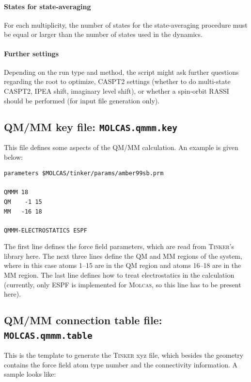 \documentclass[a4paper,10pt,DIV=15,openany,twoside=false]{scrbook}
\newcommand{\ttt}[1]{\textbf{\texttt{#1}}}
\newenvironment{example}{
  \setlength{\OuterFrameSep}{3pt}
  \vspace{0mm}
  \definecolor{shadecolor}{HTML}{E4F4FF}
  \begin{shaded}
}{
  \end{shaded}
}
\begin{document}
\paragraph{States for state-averaging}

For each multiplicity, the number of states for the state-averaging procedure must be equal or larger than the number of states used in the dynamics.

\paragraph{Further settings}

Depending on the run type and method, the script might ask further questions regarding the root to optimize, CASPT2 settings (whether to do multi-state CASPT2, IPEA shift, imaginary level shift), or whether a spin-orbit RASSI should be performed (for input file generation only).



\subsection{QM/MM key file: \ttt{MOLCAS.qmmm.key}}

This file defines some aspects of the QM/MM calculation. An example is given below:

\begin{example}
\begin{verbatim}
parameters $MOLCAS/tinker/params/amber99sb.prm

QMMM 18
QM    -1 15
MM   -16 18

QMMM-ELECTROSTATICS ESPF
\end{verbatim}
\end{example}

The first line defines the force field parameters, which are read from \textsc{Tinker}'s library here. The next three lines define the QM and MM regions of the system, where in this case atoms 1--15 are in the QM region and atoms 16--18 are in the MM region. The last line defines how to treat electrostatics in the calculation (currently, only ESPF is implemented for \textsc{Molcas}, so this line has to be present here).

\subsection{QM/MM connection table file: \ttt{MOLCAS.qmmm.table}}

This is the template to generate the \textsc{Tinker} xyz file, which besides the geometry contains the force field atom type number and the connectivity information. A sample looks like:
\end{document}
